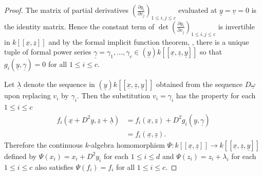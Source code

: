 \documentclass[12pt]{amsart}
\numberwithin{equation}{theorem}
\theoremstyle{plain}
\begin{document}
\begin{proof}
    The matrix of partial derivatives $(\frac{\partial g_i}{\partial v_j})_{1\leq i,j\leq c}$ evaluated at $\underline{y} = \underline{v} = 0$ is the identity matrix. Hence the constant term of $\det(\frac{\partial g_i}{\partial v_j})_{1\leq i,j\leq c}$ is invertible in $k[[\underline{x},\underline{z}]]$ and by the formal implicit function theorem, \cite[Corollary on p.~A.IV.37]{BourbakiAlgebraII}, there is a unique tuple of formal power series $\underline{\gamma} = \gamma_1,\ldots,\gamma_c\in (\underline{y})k[[\underline{x},\underline{z},\underline{y}]]$ so that $g_i(\underline{y},\underline{\gamma}) = 0$ for all $1\leq i \leq c$.
    

   Let $\underline{\lambda}$ denote the sequence in $(\underline{y})k[[\underline{x},\underline{z},\underline{y}]]$ obtained from the sequence $D\underline{\omega}$ upon replacing $v_i$ by $\gamma_i$. Then the substitution $v_i = \gamma_i$ has the property for each $1\leq i\leq c$
   \begin{align*}
   f_i(\underline{x}+D^2\underline{y},\underline{z}+\underline{\lambda}) &= f_i(\underline{x},\underline{z}) + D^2g_i(\underline{y},\underline{\gamma})\\
   &=f_i(\underline{x},\underline{z}).
   \end{align*}
   Therefore the continuous $k$-algebra homomorphism $\Psi: k[[\underline{x},\underline{z}]] \to k[[\underline{x},\underline{z},\underline{y}]]$ defined by $\Psi(x_i) = x_i+D^2y_i$ for each $1\leq i\leq d$ and $\Psi(z_i) = z_i+\lambda_i$ for each $1\leq i\leq c$ also satisfies $\Psi(f_i)= f_i$ for all $1\leq i\leq c$.
\end{proof}

\end{document}
